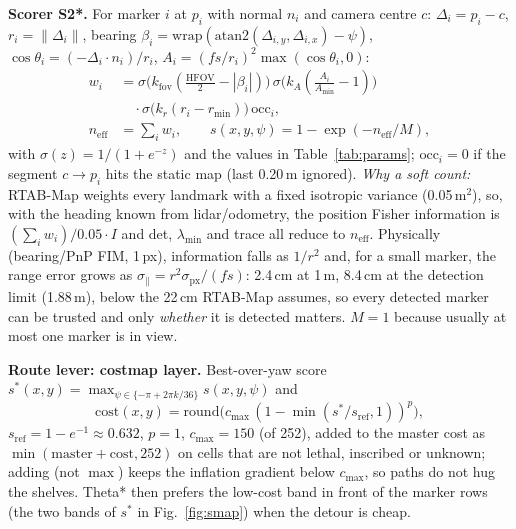 \documentclass[10pt,twocolumn]{article}
\begin{document}
\textbf{Scorer S2*.} For marker $i$ at $p_i$ with normal $n_i$ and camera centre $c$: $\Delta_i=p_i-c$, $r_i=\|\Delta_i\|$, bearing $\beta_i=\mathrm{wrap}(\mathrm{atan2}(\Delta_{i,y},\Delta_{i,x})-\psi)$, $\cos\theta_i=(-\Delta_i\cdot n_i)/r_i$, $A_i=(f s/r_i)^2\max(\cos\theta_i,0)$:
\begin{align}
w_i&=\sigma\!\big(k_{\mathrm{fov}}(\tfrac{\mathrm{HFOV}}{2}-|\beta_i|)\big)\,
    \sigma\!\big(k_A(\tfrac{A_i}{A_{\min}}-1)\big)\nonumber\\
   &\quad\cdot\sigma\!\big(k_r(r_i-r_{\min})\big)\,\mathrm{occ}_i,\nonumber\\
n_{\mathrm{eff}}&=\textstyle\sum_i w_i,\qquad s(x,y,\psi)=1-\exp(-n_{\mathrm{eff}}/M),
\end{align}
with $\sigma(z)=1/(1+e^{-z})$ and the values in Table~\ref{tab:params}; $\mathrm{occ}_i=0$ if the segment $c\to p_i$ hits the static map (last 0.20\,m ignored).
\emph{Why a soft count:} RTAB-Map weights every landmark with a fixed isotropic variance (0.05\,m$^2$), so, with the heading known from lidar/odometry, the position Fisher information is $(\sum_i w_i)/0.05\cdot I$ and det, $\lambda_{\min}$ and trace all reduce to $n_{\mathrm{eff}}$. Physically (bearing/PnP FIM, 1\,px), information falls as $1/r^2$ and, for a small marker, the range error grows as $\sigma_\parallel=r^2\sigma_{\mathrm{px}}/(fs)$: 2.4\,cm at 1\,m, 8.4\,cm at the detection limit (1.88\,m), below the 22\,cm RTAB-Map assumes, so every detected marker can be trusted and only \emph{whether} it is detected matters.
$M=1$ because usually at most one marker is in view.

\textbf{Route lever: costmap layer.} Best-over-yaw score $s^*(x,y)=\max_{\psi\in\{-\pi+2\pi k/36\}}s(x,y,\psi)$ and
\begin{equation}
\mathrm{cost}(x,y)=\mathrm{round}\big(c_{\max}\,(1-\min(s^*/s_{\mathrm{ref}},1))^p\big),
\end{equation}
$s_{\mathrm{ref}}=1-e^{-1}\approx0.632$, $p=1$, $c_{\max}=150$ (of 252), added to the master cost as $\min(\text{master}+\text{cost},252)$ on cells that are not lethal, inscribed or unknown; adding (not $\max$) keeps the inflation gradient below $c_{\max}$, so paths do not hug the shelves. Theta* then prefers the low-cost band in front of the marker rows (the two bands of $s^*$ in Fig.~\ref{fig:smap}) when the detour is cheap.
\end{document}
